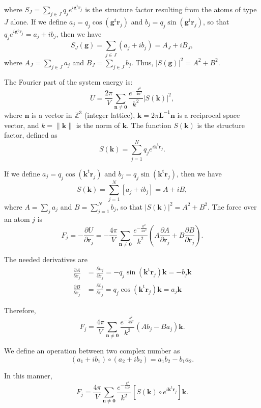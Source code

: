 \documentclass[11pt]{article}
\newcommand{\vt}[1]{\boldsymbol{\mathbf{#1}}}           %
\newcommand{\tr}[1]{#1^\text{t}}                        %
\begin{document}
where $S_J = \sum_{j \in J} q_j e^{i \tr{\vt g}{\vt r}_j}$ is the structure factor resulting from the atoms of type $J$ alone. If we define $a_j = q_j \cos(\tr{\vt g}{\vt r}_j)$ and $b_j = q_j \sin(\tr{\vt g}{\vt r}_j)$, so that $q_j e^{i \tr{\vt g}{\vt r}_j} = a_j + ib_j$, then we have
\begin{equation*}
S_J(\vt g) = \sum_{j \in J} (a_j + i b_j) = A_J + i B_J,
\end{equation*}
where $A_J = \sum_{j \in J} a_j$ and $B_J = \sum_{j \in J} b_j$. Thus, $|S(\vt g)|^2 = A^2 + B^2$.

The Fourier part of the system energy is:
\begin{equation*}
U = \frac{2\pi}{V}\sum_{\vt n \neq \vt 0} \frac{e^{-\frac{k^2}{4\alpha^2}}}{k^2} |S(\vt k)|^2,
\end{equation*}
where $\vt n$ is a vector in $\mathbb Z^3$ (integer lattice), $\vt k = 2\pi \vt L^{-1}{\vt n}$ is a reciprocal space vector, and $k = \|\vt k\|$ is the norm of $\vt k$. The function $S(\vt k)$ is the structure factor, defined as
\begin{equation*}
S(\vt k) = \sum_{j=1}^N q_j e^{i\tr{\vt k}{\vt r}_j}.
\end{equation*}

If we define $a_j = q_j \cos(\tr{\vt k}{\vt r}_j)$ and $b_j = q_j \sin(\tr{\vt k}{\vt r}_j)$, then we have
\begin{equation*}
S(\vt k) = \sum_{j=1}^N \left[a_j + i b_j\right] = A + i B,
\end{equation*}
where $A = \sum_j a_j$ and $B = \sum_{j=1}^N b_j$, so that $|S(\vt k)|^2 = A^2 + B^2$. The force over an atom $j$ is
\begin{equation*}
F_j = -\frac{\partial U}{\partial \vt r_j} = -\frac{4\pi}{V}\sum_{\vt n \neq \vt 0} \frac{e^{-\frac{k^2}{4\alpha^2}}}{k^2} \left( A \frac{\partial A}{\partial \vt r_j} + B \frac{\partial B}{\partial \vt r_j} \right).
\end{equation*}

The needed derivatives are
\begin{align*}
\frac{\partial A}{\partial \vt r_j} &= \frac{\partial a_j}{\partial \vt r_j} = -q_j \sin(\tr{\vt k}{\vt r}_j){\vt k} = -b_j{\vt k} \\
\frac{\partial B}{\partial \vt r_j} &= \frac{\partial b_j}{\partial \vt r_j} = q_j \cos(\tr{\vt k}{\vt r}_j){\vt k} = a_j{\vt k}
\end{align*}

Therefore,
\begin{equation*}
F_j = \frac{4\pi}{V}\sum_{\vt n \neq \vt 0} \frac{e^{-\frac{k^2}{4\alpha^2}}}{k^2} \left( A b_j - B a_j \right){\vt k}.
\end{equation*}

We define an operation between two complex number as
\begin{equation*}
(a_1 + i b_1)\circ(a_2 + i b_2) = a_1 b_2 - b_1 a_2.
\end{equation*}

In this manner,
\begin{equation*}
F_j = \frac{4\pi}{V}\sum_{\vt n \neq \vt 0} \frac{e^{-\frac{k^2}{4\alpha^2}}}{k^2} \left[ S(\vt k) \circ e^{i\tr{\vt k}{\vt r}_j} \right]{\vt k}.
\end{equation*}
\end{document}
